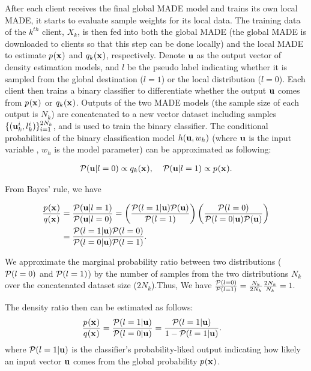After each client receives the final global MADE model and trains its own local MADE, it starts to evaluate sample weights for its local data. The training data of the $k^{th}$ client, $X_k$, is then fed into both the global MADE (the global MADE is downloaded to clients so that this step can be done locally) and the local MADE to estimate $p_{}(\mathbf{x_{}})$ and $q_{k}(\mathbf{x_{}})$, respectively. Denote $\mathbf{u}{}$ as the output vector of density estimation models, and $l$ be the pseudo label indicating whether it is sampled from the global destination ($l=1$) or the local distribution ($l=0$). Each client then trains a binary classifier to differentiate whether the output $\mathbf{u}$ comes from $p_{}(\mathbf{x_{}})$ or $q_{k}(\mathbf{x_{}})$. Outputs of the two MADE models (the sample size of each output is $N_k$) are concatenated to a new vector dataset including samples $\{(\mathbf{u}{}_k^i,l_k^i) \}_{i=1}^{2N_k}$, and is used to train the binary classifier. The conditional probabilities of the binary classification model $h(\mathbf{u},w_h)$ (where $\mathbf{u}$ is the input variable , $w_h$ is the model parameter) can be approximated as following: 

\begin{align}
\mathcal{P}(\mathbf{u} | l=0 )  \propto  q_{k}(\mathbf{x_{}})  ,\;\;\;\;
\mathcal{P}(\mathbf{u} | l=1 )  \propto p_{}(\mathbf{x_{}}).
\end{align}

From Bayes' rule, we have

\begin{align}
\frac{p_{}(\mathbf{x_{}})}{q_{}(\mathbf{x_{}})} &= \frac{\mathcal{P}(\mathbf{u} | l=1 )}{ \mathcal{P}(\mathbf{u} | l=0 ) }       
= \left( \frac{\mathcal{P}(l=1| \mathbf{u} ) \mathcal{P}(\mathbf{u})}{\mathcal{P}(l=1)} \right)     
\left( \frac{\mathcal{P}(l=0)} {\mathcal{P}(l=0| \mathbf{u} ) \mathcal{P}(\mathbf{u})}\right)  \label{eq:pq1}\\
&= \frac{  \mathcal{P}(l=1|\mathbf{u} )  \mathcal{P}(l=0) }{ \mathcal{P}(l=0|\mathbf{u} )  \mathcal{P}(l=1)  }.  \label{eq:pq2} 
\end{align}

We approximate the marginal probability ratio between two distributions ( $\mathcal{P}(l=0)$  and $\mathcal{P}(l=1)$) by the number of samples from the two distributions $N_k$ over the concatenated dataset size ($2N_k$).Thus,  We have
$\frac{ \mathcal{P}(l=0) }{ \mathcal{P}(l=1)  } = \frac{N_k}{2N_k} \frac{2N_k}{N_k}=1. \label{eq:marginalratio}$


The density ratio then can be estimated as follows:
\begin{align}
\frac{p_{}(\mathbf{x_{}})}{q_{}(\mathbf{x_{}})} &= \frac{  \mathcal{P}(l=1|\mathbf{u} )  }{ \mathcal{P}(l=0|\mathbf{u} )   } 
= \frac{  \mathcal{P}(l=1|\mathbf{u} )  }{ 1 - \mathcal{P}(l=1|\mathbf{u} )   }. \label{eq:ratio2}
\end{align} 
where $\mathcal{P}(l=1|\mathbf{u}{})$ is the classifier's probability-liked output indicating how likely an input vector $\mathbf{u}$ comes from the global probability $p_{}(\mathbf{x_{}})$. 

